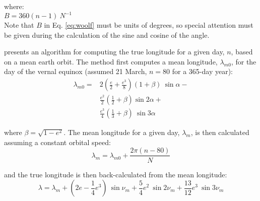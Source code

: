 \noindent where: \\
\indent $B = 360 \left(n - 1\right)\: N^{-1}$ \\

\noindent Note that $B$ in Eq. \ref{eq:woolf} must be units of degrees, so special attention must be given during the calculation of the sine and cosine of the angle.

\cite{berger78} presents an algorithm for computing the true longitude for a given day, $n$, based on a mean earth orbit. 
The method first computes a mean longitude, $\lambda_{m0}$, for the day of the vernal equinox (assumed 21 March, $n = 80$ for a 365-day year): 
\begin{equation}
\label{eq:lambdamo}
\begin{split}
	\lambda_{m0} = & 2\left(\frac{e}{2}+\frac{e^3}{8}\right)\left(1+\beta\right)\:\sin\alpha - \\
	& \frac{e^2}{2}\left(\frac{1}{2}+\beta\right)\sin 2\alpha + \\
	& \frac{e^3}{4}\left(\frac{1}{3}+\beta\right)\:\sin 3\alpha
\end{split}
\end{equation}

\noindent where $\beta = \sqrt{1-e^2}$. 
The mean longitude for a given day, $\lambda_m$, is then calculated assuming a constant orbital speed: 
\begin{equation}
\label{eq:lambdam}
	\lambda_m = \lambda_{m0} + \frac{2\pi\left(n-80\right)}{N}
\end{equation}

\noindent and the true longitude is then back-calculated from the mean longitude:
\begin{equation}
\label{eq:lambdat}
	\lambda = \lambda_m + \left(2e-\frac{1}{4}e^3\right)\:\sin\nu_m + \frac{5}{4}e^2\:\sin 2\nu_m + \frac{13}{12}e^3\:\sin 3\nu_m
\end{equation}

